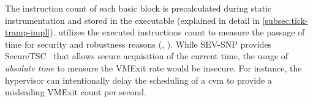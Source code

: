 
The instruction count of each basic block is precalculated during static instrumentation and stored in the executable (explained in detail in \cref{subsec:tick-tramp-impl}).
\thename utilizes the executed instructions count to measure the passage of time for security and robustness reasons (\reqsovereign, \reqrobustpolicy).
While SEV-SNP provides SecureTSC~\cite{amd64} that allows secure acquisition of the current time, the usage of \emph{absolute time} to measure the VMExit rate would be insecure.
For instance, the hypervisor can intentionally delay the scheduling of a \gls{cvm} to provide a misleading VMExit count per second.







